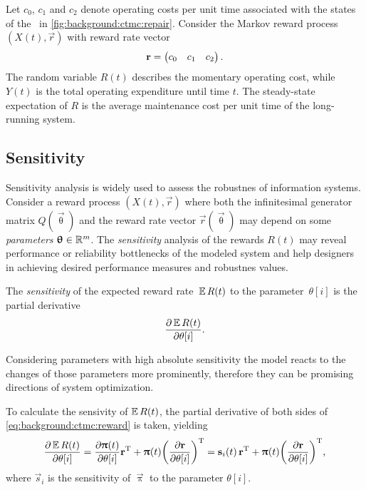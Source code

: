 \begin{example}
  Let $c_0$, $c_1$ and $c_2$ denote operating costs per unit time
  associated with the states of the \CTMC\ in
  \cref{fig:background:ctmc:repair}. Consider the Markov reward
  process $(X(t), \vec{r})$ with reward rate vector
  \begin{equation}
    \vec{r} = \begin{pmatrix} c_0 & c_1 & c_2 \end{pmatrix} \text.
  \end{equation}
  The random variable $R(t)$ describes the momentary operating cost,
  while $Y(t)$ is the total operating expenditure until time $t$. The
  steady-state expectation of $R$ is the average maintenance cost per
  unit time of the long-running system.
\end{example}

\subsection{Sensitivity}

Sensitivity analysis is widely used to assess the robustnes of information systems.
Consider a reward process $(X(t), \vec{r})$ where both the
infinitesimal generator matrix $Q(\vec{\uptheta})$ and the reward rate
vector $\vec{r}(\vec{\uptheta})$ may depend on some \emph{parameters}
$\vec{\uptheta} \in \RR^m$. The \emph{sensitivity} analysis of the
rewards $R(t)$ may reveal performance or reliability bottlenecks of
the modeled system and help designers in achieving desired performance measures and robustnes values.

\begin{dfn}
  The \emph{sensitivity} of the expected reward rate~$\Ex R(t)$ to the
  parameter~$\theta[i]$ is the partial derivative
  \begin{equation}
    \frac{\partial \Ex R(t)}{\partial \theta[i]} \text.
  \end{equation}
\end{dfn}

Considering parameters with high absolute sensitivity the model reacts to the changes of those parameters more prominently, therefore they can be promising directions of system optimization.

To calculate the sensivity of $\Ex R(t)$, the partial derivative of
both sides of \cref{eq:background:ctmc:reward} is taken, yielding
\begin{equation}
  \label{eq:background:ctmc:sensitivity:productrule}
  \frac{\partial \Ex R(t)}{\partial \theta[i]} = \frac{\partial
    \vec{\uppi}(t)}{\partial \theta[i]} \vec{r}^\T + \vec{\uppi}(t)
  \mleft(\frac{\partial \vec{r}}{\partial \theta[i]}\mright)^\T =
  \vec{s}_i(t) \, \vec{r}^\T + \vec{\uppi}(t)
  \mleft(\frac{\partial \vec{r}}{\partial \theta[i]}\mright)^\T \text,
\end{equation}
where $\vec{s}_i$ is the sensitivity of $\vec{\uppi}$ to the parameter
$\theta[i]$.

